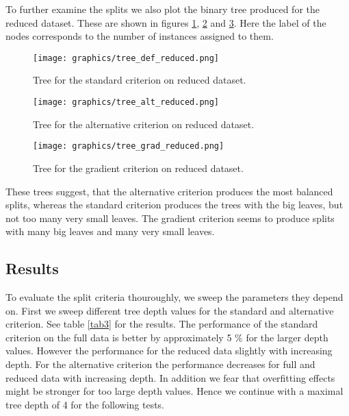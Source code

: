\documentclass{article}
\begin{document}
\FloatBarrier

To further examine the splits we also plot the binary tree produced for the reduced dataset.
These are shown in figures \ref{fig2d}, \ref{fig2e} and \ref{fig2f}. 
Here the label of the nodes corresponds to the number of instances assigned to them.

\begin{figure}[h]
	\centering
	\texttt{[image: graphics/tree\_def\_reduced.png]}
	\caption{Tree for the standard criterion on reduced dataset.}
	\label{fig2d}
\end{figure}

\begin{figure}[h]
	\centering
	\texttt{[image: graphics/tree\_alt\_reduced.png]}
	\caption{Tree for the alternative criterion on reduced dataset.}
	\label{fig2e}
\end{figure}

\begin{figure}[h]
	\centering
	\texttt{[image: graphics/tree\_grad\_reduced.png]}
	\caption{Tree for the gradient criterion on reduced dataset.}
	\label{fig2f}
\end{figure}

These trees suggest, that the alternative criterion produces the most balanced splits, whereas the 
standard criterion produces the trees with the big leaves, but not too many very small leaves.
The gradient criterion seems to produce splits with many big leaves and many very small leaves.

\FloatBarrier

\subsection{Results}

To evaluate the split criteria thouroughly, we sweep the parameters they depend on.
\newline
First we sweep different tree depth values for the standard and alternative criterion.
See table \ref{tab3} for the results. The performance of the standard criterion on the full data 
is better by approximately 5 \% for the larger depth values.
However the performance for the reduced data slightly with increasing depth.
For the alternative criterion the performance decreases for full and reduced data with increasing depth.
In addition we fear that overfitting effects might be stronger for too large depth values.
Hence we continue with a maximal tree depth of 4 for the following tests.
\end{document}
